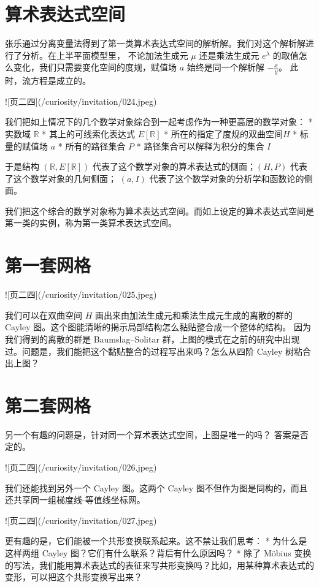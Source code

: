 \documentclass[a4paper,12pt]{book}
\numberwithin{problem}{section}
\numberwithin{definition}{section}
\numberwithin{lemma}{section}
\numberwithin{proposition}{section}
\numberwithin{theorem}{section}
\numberwithin{grammar}{section}
\numberwithin{program}{section}
\numberwithin{convention}{section}
\numberwithin{corollary}{section}
\begin{document}
\section{算术表达式空间}

张乐通过分离变量法得到了第一类算术表达式空间的解析解。我们对这个解析解进行了分析。在上半平面模型里，
不论加法生成元 $\mu$ 还是乘法生成元 $e^\lambda$ 的取值怎么变化，我们只需要变化空间的度规，赋值场 $a$ 始终是同一个解析解 $-\frac{x}{y}$。
此时，流方程是成立的。

![页二四](/curiosity/invitation/024.jpeg)

我们把如上情况下的几个数学对象综合到一起考虑作为一种更高层的数学对象：
* 实数域 $\mathbb{R}$
* 其上的可线索化表达式 $E[\mathbb{R}]$
* 所在的指定了度规的双曲空间$H$
* 标量的赋值场 $a$
* 所有的路径集合 $P$
* 路径集合可以解释为积分的集合 $I$

于是结构 $(\mathbb{R}, E[\mathbb{R}])$ 代表了这个数学对象的算术表达式的侧面；$(H, P)$ 代表了这个数学对象的几何侧面；
$(a, I)$ 代表了这个数学对象的分析学和函数论的侧面。

我们把这个综合的数学对象称为算术表达式空间。而如上设定的算术表达式空间是第一类的实例，称为第一类算术表达式空间。

\section{第一套网格}

![页二四](/curiosity/invitation/025.jpeg)

我们可以在双曲空间 $H$ 画出来由加法生成元和乘法生成元生成的离散的群的 Cayley 图。这个图能清晰的揭示局部结构怎么黏贴整合成一个整体的结构。
因为我们得到的离散的群是 Baumslag–Solitar 群，上图的模式在之前的研究中出现过。问题是，我们能把这个黏贴整合的过程写出来吗？怎么从四阶 Cayley 树粘合出上图？

\section{第二套网格}

另一个有趣的问题是，针对同一个算术表达式空间，上图是唯一的吗？ 答案是否定的。

![页二四](/curiosity/invitation/026.jpeg)

我们还能找到另外一个 Cayley 图。这两个 Cayley 图不但作为图是同构的，而且还共享同一组梯度线-等值线坐标网。

![页二四](/curiosity/invitation/027.jpeg)

更有趣的是，它们能被一个共形变换联系起来。这不禁让我们思考：
* 为什么是这样两组 Cayley 图？它们有什么联系？背后有什么原因吗？
* 除了 Möbius 变换的写法，我们能用算术表达式的表征来写共形变换吗？比如，用某种算术表达式的变形，可以把这个共形变换写出来？
\end{document}
